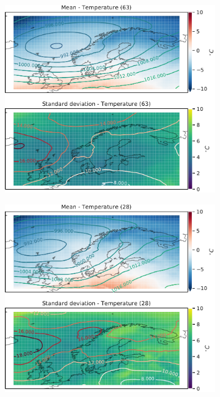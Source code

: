 \begin{figure}
     \centering
     \begin{subfigure}[b]{0.49\textwidth}
         \centering
         \includegraphics[width=\textwidth]{Figures/TempENBR.pdf}
         \caption{}
         \label{fig:ENBRTemperature}
     \end{subfigure}
     \hfill
     \begin{subfigure}[b]{0.49\textwidth}
         \centering
         \includegraphics[width=\textwidth]{Figures/TempENZV.pdf}
         \caption{}
         \label{fig:ENZVTemperature}
     \end{subfigure}
     

\end{figure}
